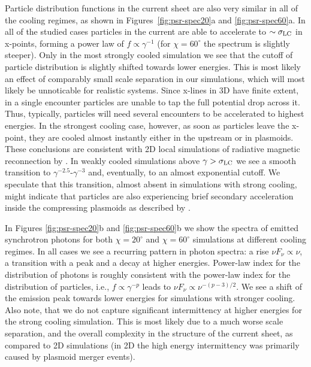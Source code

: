 Particle distribution functions in the current sheet are also very similar in all of the cooling regimes, as shown in Figures~\ref{fig:psr-spec20}a and \ref{fig:psr-spec60}a. In all of the studied cases particles in the current are able to accelerate to $\sim\sigma_{\rm LC}$ in x-points, forming a power law of $f\propto \gamma^{-1}$ (for $\chi=60^\circ$ the spectrum is slightly steeper). Only in the most strongly cooled simulation we see that the cutoff of particle distribution is slightly shifted towards lower energies. This is most likely an effect of comparably small scale separation in our simulations, which will most likely be unnoticable for realistic systems. Since x-lines in 3D have finite extent, in a single encounter particles are unable to tap the full potential drop across it. Thus, typically, particles will need several encounters to be accelerated to highest energies. In the strongest cooling case, however, as soon as particles leave the x-point, they are cooled almost instantly either in the upstream or in plasmoids. These conclusions are consistent with 2D local simulations of radiative magnetic reconnection by \cite{2019ApJ...877...53H}. In weakly cooled simulations above $\gamma>\sigma_{\rm LC}$ we see a smooth transition to $\gamma^{-2.5}\text{-}\gamma^{-3}$ and, eventually, to an almost exponential cutoff. We speculate that this transition, almost absent in simulations with strong cooling, might indicate that particles are also experiencing brief secondary acceleration inside the compressing plasmoids as described by \cite{2018MNRAS.481.5687P,2021ApJ...912...48H}.

In Figures \ref{fig:psr-spec20}b and \ref{fig:psr-spec60}b we show the spectra of emitted synchrotron photons for both $\chi=20^\circ$ and $\chi=60^\circ$ simulations at different cooling regimes. In all cases we see a recurring pattern in photon spectra: a rise $\nu F_\nu\propto \nu$, a transition with a peak and a decay at higher energies. Power-law index for the distribution of photons is roughly consistent with the power-law index for the distribution of particles, i.e., $f\propto \gamma^{-p}$ leads to $\nu F_\nu \propto \nu^{-(p-3)/2}$. We see a shift of the emission peak towards lower energies for simulations with stronger cooling. Also note, that we do not capture significant intermittency at higher energies for the strong cooling simulation. This is most likely due to a much worse scale separation, and the overall complexity in the structure of the current sheet, as compared to 2D simulations (in 2D the high energy intermittency was primarily caused by plasmoid merger events).

